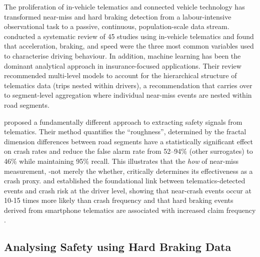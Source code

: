 \documentclass[letterpaper,8pt]{extarticle}  %
\begin{document}
\begin{doublespacing}
\begin{linenumbers}
The proliferation of in-vehicle telematics and connected vehicle technology
has transformed near-miss and hard braking detection from a labour-intensive observational
task to a passive, continuous, population-scale data stream.
\citet{Boylan2024ABehaviours} conducted a systematic review of 45 studies using
in-vehicle telematics and found that acceleration, braking, and speed were
the three most common variables used to characterise driving behaviour. In addition, machine learning has been the dominant analytical approach in insurance-focused applications. Their review recommended multi-level models to account for the hierarchical structure of telematics data (trips nested within drivers),
a recommendation that carries over to segment-level aggregation where
individual near-miss events are nested within road segments.

\citet{Nie2025VehicleAnalysis} proposed a fundamentally different approach to extracting
safety signals from telematics. Their method quantifies the ``roughness'', determined by the fractal dimension differences between road segments have a statistically significant effect on crash rates and
reduce the false alarm rate from 52--94\% (other surrogates) to 46\% while
maintaining 95\% recall. This illustrates that the \emph{how} of near-miss
measurement, -not merely the whether, critically determines its
effectiveness as a crash proxy. \citet{Ayuso2019TelematicsWomens} and \citet{Guo2010NearStudies}
established the foundational link between telematics-detected events and
crash risk at the driver level, showing that near-crash events occur at 10-15 times  more likely than crash frequency and that hard braking events derived from smartphone telematics are associated with
increased claim frequency \citep{Arumi2024CanEvents}.

\subsection{Analysing Safety using Hard Braking Data }



\end{linenumbers}
\end{doublespacing}
\end{document}
